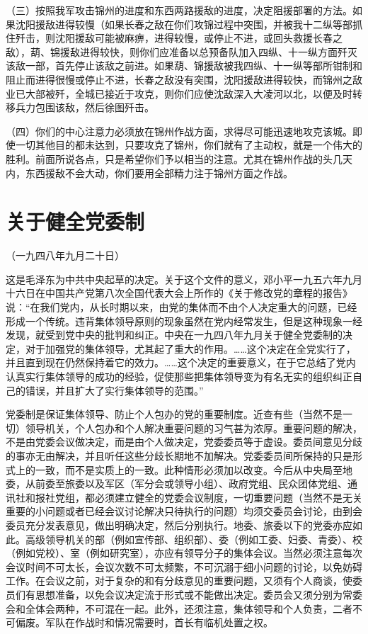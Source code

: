 \documentclass[UTF-8, a5paper, 12pt]{ctexart}
\begin{document}
（三）按照我军攻击锦州的进度和东西两路援敌的进度，决定阻援部署的方法。如果沈阳援敌进得较慢（如果长春之敌在你们攻锦过程中突围，并被我十二纵等部抓住歼击，则沈阳援敌可能被麻痹，进得较慢，或停止不进，或回头救援长春之敌），葫、锦援敌进得较快，则你们应准备以总预备队加入四纵、十一纵方面歼灭该敌一部，首先停止该敌之前进。如果葫、锦援敌被我四纵、十一纵等部所钳制和阻止而进得很慢或停止不进，长春之敌没有突围，沈阳援敌进得较快，而锦州之敌业已大部被歼，全城已接近于攻克，则你们应使沈敌深入大凌河以北，以便及时转移兵力包围该敌，然后徐图歼击。

（四）你们的中心注意力必须放在锦州作战方面，求得尽可能迅速地攻克该城。即使一切其他目的都未达到，只要攻克了锦州，你们就有了主动权，就是一个伟大的胜利。前面所说各点，只是希望你们予以相当的注意。尤其在锦州作战的头几天内，东西援敌不会大动，你们要用全部精力注于锦州方面之作战。

\section{关于健全党委制}

（一九四八年九月二十日）

这是毛泽东为中共中央起草的决定。关于这个文件的意义，邓小平一九五六年九月十六日在中国共产党第八次全国代表大会上所作的《关于修改党的章程的报告》说：“在我们党内，从长时期以来，由党的集体而不由个人决定重大的问题，已经形成一个传统。违背集体领导原则的现象虽然在党内经常发生，但是这种现象一经发现，就受到党中央的批判和纠正。中央在一九四八年九月关于健全党委制的决定，对于加强党的集体领导，尤其起了重大的作用。……这个决定在全党实行了，并且直到现在仍然保持着它的效力。……这个决定的重要意义，在于它总结了党内认真实行集体领导的成功的经验，促使那些把集体领导变为有名无实的组织纠正自己的错误，并且扩大了实行集体领导的范围。”

党委制是保证集体领导、防止个人包办的党的重要制度。近查有些（当然不是一切）领导机关，个人包办和个人解决重要问题的习气甚为浓厚。重要问题的解决，不是由党委会议做决定，而是由个人做决定，党委委员等于虚设。委员间意见分歧的事亦无由解决，并且听任这些分歧长期地不加解决。党委委员间所保持的只是形式上的一致，而不是实质上的一致。此种情形必须加以改变。今后从中央局至地委，从前委至旅委以及军区（军分会或领导小组）、政府党组、民众团体党组、通讯社和报社党组，都必须建立健全的党委会议制度，一切重要问题（当然不是无关重要的小问题或者已经会议讨论解决只待执行的问题）均须交委员会讨论，由到会委员充分发表意见，做出明确决定，然后分别执行。地委、旅委以下的党委亦应如此。高级领导机关的部（例如宣传部、组织部）、委（例如工委、妇委、青委）、校（例如党校）、室（例如研究室），亦应有领导分子的集体会议。当然必须注意每次会议时间不可太长，会议次数不可太频繁，不可沉溺于细小问题的讨论，以免妨碍工作。在会议之前，对于复杂的和有分歧意见的重要问题，又须有个人商谈，使委员们有思想准备，以免会议决定流于形式或不能做出决定。委员会又须分别为常委会和全体会两种，不可混在一起。此外，还须注意，集体领导和个人负责，二者不可偏废。军队在作战时和情况需要时，首长有临机处置之权。 
\end{document}
